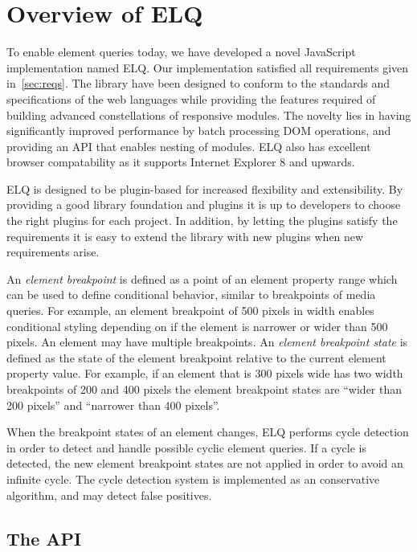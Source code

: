 \documentclass{acm_proc_article-sp}
\newcommand{\elq}{ELQ}
\begin{document}
\section{Overview of \elq{}}
  To enable element queries today, we have developed a novel JavaScript implementation named \elq{}.
  Our implementation satisfied all requirements given in~\ref{sec:reqs}.
  The library have been designed to conform to the standards and specifications of the web languages while providing the features required of building advanced constellations of responsive modules.
  The novelty lies in having significantly improved performance by batch processing DOM operations, and providing an API that enables nesting of modules.
  \elq{} also has excellent browser compatability as it supports Internet Explorer 8 and upwards.

  \elq{} is designed to be plugin-based for increased flexibility and extensibility.
  By providing a good library foundation and plugins it is up to developers to choose the right plugins for each project.
  In addition, by letting the plugins satisfy the requirements it is easy to extend the library with new plugins when new requirements arise.

  An \emph{element breakpoint} is defined as a point of an element property range which can be used to define conditional behavior, similar to breakpoints of media queries.
  For example, an element breakpoint of 500 pixels in width enables conditional styling depending on if the element is narrower or wider than 500 pixels.
  An element may have multiple breakpoints.
  An \emph{element breakpoint state} is defined as the state of the element breakpoint relative to the current element property value.
  For example, if an element that is 300 pixels wide has two width breakpoints of 200 and 400 pixels the element breakpoint states are ``wider than 200 pixels'' and ``narrower than 400 pixels''.

  When the breakpoint states of an element changes, \elq{} performs cycle detection in order to detect and handle possible cyclic element queries.
  If a cycle is detected, the new element breakpoint states are not applied in order to avoid an infinite cycle.
  The cycle detection system is implemented as an conservative algorithm, and may detect false positives.

  \subsection{The API}
\end{document}
